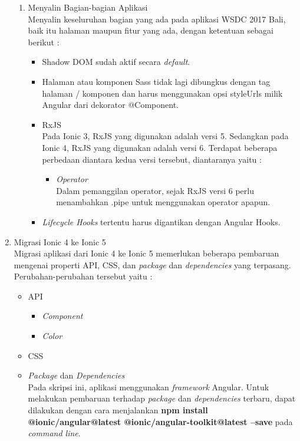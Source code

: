\begin{enumerate}
\begin{enumerate}
		\item Menyalin Bagian-bagian Aplikasi \\
		Menyalin keseluruhan bagian yang ada pada aplikasi WSDC 2017 Bali, baik itu halaman maupun fitur yang ada, dengan ketentuan sebagai berikut :
		\begin{itemize}
			\item Shadow DOM sudah aktif secara {\it default}.
			\item Halaman atau komponen Sass tidak lagi dibungkus dengan tag halaman / komponen dan harus menggunakan opsi styleUrls milik Angular dari dekorator @Component.
			\item RxJS \\
			Pada Ionic 3, RxJS yang digunakan adalah versi 5. Sedangkan pada Ionic 4, RxJS yang digunakan adalah versi 6. Terdapat beberapa perbedaan diantara kedua versi tersebut, diantaranya yaitu :
			\begin{itemize}
				\item {\it Operator} \\
				Dalam pemanggilan operator, sejak RxJS versi 6 perlu menambahkan .pipe untuk menggunakan operator apapun.
			\end{itemize}
			\item {\it Lifecycle Hooks} tertentu harus digantikan dengan Angular Hooks.
		\end{itemize}
	\end{enumerate}
	\item Migrasi Ionic 4 ke Ionic 5 \\
	Migrasi aplikasi dari Ionic 4 ke Ionic 5 memerlukan beberapa pembaruan mengenai properti API, CSS, dan {\it package} dan {\it dependencies} yang terpasang. Perubahan-perubahan tersebut yaitu :
	\begin{itemize}
		\item API
		\begin{itemize}
			\item {\it Component}
			\item {\it Color}
			
		\end{itemize}
		\item CSS \\
		
		\item {\it Package} dan {\it Dependencies} \\
		Pada skripsi ini, aplikasi menggunakan {\it framework} Angular. Untuk melakukan pembaruan terhadap {\it package} dan {\it dependencies} terbaru, dapat dilakukan dengan cara menjalankan \textbf{npm install @ionic/angular@latest @ionic/angular-toolkit@latest --save} pada {\it command line}.
	\end{itemize}
\end{enumerate}

